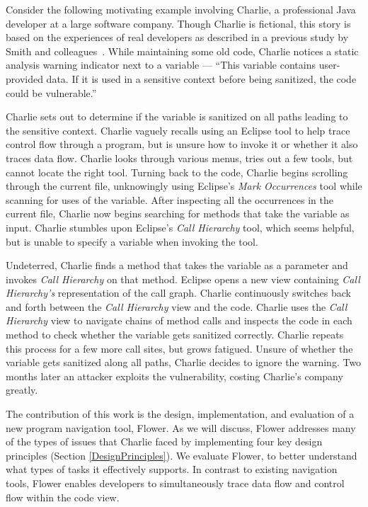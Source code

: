 \documentclass[conference]{IEEEtran}
\begin{document}

Consider the following motivating example involving Charlie, a professional Java developer at a large software company.
Though Charlie is fictional, this story is based on the experiences of real developers as described in a previous study by Smith and colleagues~\cite{Smith2015}.
While maintaining some old code, Charlie notices a static analysis warning indicator next to a variable --- ``This variable contains user-provided data. 
If it is used in a sensitive context before being sanitized, the code could be vulnerable.''

Charlie sets out to determine if the variable is sanitized on all paths leading to the sensitive context.
Charlie vaguely recalls using an Eclipse tool to help trace control flow through a program, but is unsure how to invoke it or whether it also traces data flow.
Charlie looks through various menus, tries out a few tools, but cannot locate the right tool.
Turning back to the code, Charlie begins scrolling through the current file, unknowingly using Eclipse's \emph{Mark Occurrences} tool while scanning for uses of the variable. 
After inspecting all the occurrences in the current file, Charlie now begins searching for methods that take the variable as input.
Charlie stumbles upon Eclipse's \emph{Call Hierarchy} tool, which seems helpful, but is unable to specify a variable when invoking the tool.

Undeterred, Charlie finds a method that takes the variable as a parameter and invokes \emph{Call Hierarchy} on that method.
Eclipse opens a new view containing \emph{Call Hierarchy's} representation of the call graph.
Charlie continuously switches back and forth between the \emph{Call Hierarchy} view and the code.
Charlie uses the \emph{Call Hierarchy} view to navigate chains of method calls and inspects the code in each method to check whether the variable gets sanitized correctly.
Charlie repeats this process for a few more call sites, but grows fatigued. 
Unsure of whether the variable gets sanitized along all paths, Charlie decides to ignore the warning.
Two months later an attacker exploits the vulnerability, costing Charlie's company greatly. 

The contribution of this work is the design, implementation, and evaluation of a new program navigation tool, Flower.
As we will discuss, Flower  addresses many of the types of issues that Charlie faced by implementing four key design principles (Section \ref{DesignPrinciples}).
We evaluate Flower, to better understand what types of tasks it effectively supports. 
In contrast to existing navigation tools, Flower  enables developers to simultaneously trace data flow and control flow within the code view. 
\end{document}
